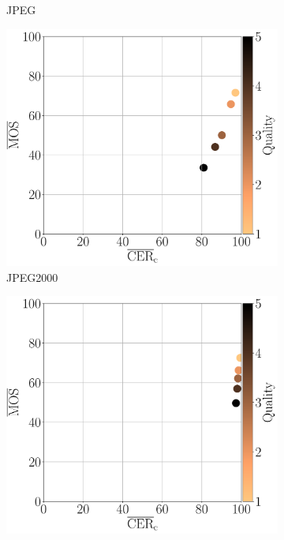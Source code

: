 \begin{figure}[h!]
\begin{subfigure}[b]{0.3\textwidth}
        \caption{JPEG}
        \label{fig:mos_cer_ref_mean_ezocr_JPEG}
    \end{subfigure}
    \hfill
    \begin{subfigure}[b]{0.3\textwidth}
        \includegraphics[width=\textwidth]{../../images/analyze/mos_cer_ref_mean_ezocr_JPEG2000.pdf}
        \caption{JPEG2000}
        \label{fig:mos_cer_ref_mean_ezocr_JPEG2000}
    \end{subfigure}
    \newline
    \begin{subfigure}[b]{0.3\textwidth}
        \includegraphics[width=\textwidth]{../../images/analyze/mos_cer_ref_mean_ezocr_CSC.pdf}

\end{subfigure}
\end{figure}
